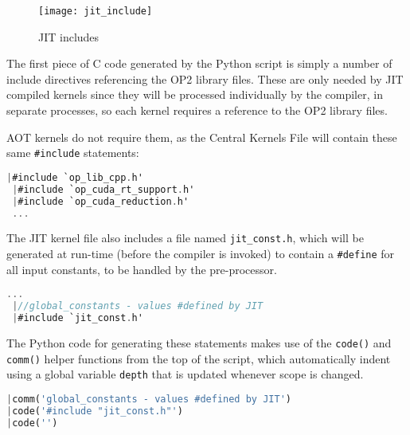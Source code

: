 \clearpage
%
\begin{wrapfigure}[10]{r}{.33\textwidth}
  \centering
  \caption{JIT includes}
  \label{fig:jit_include}
  \texttt{[image: jit\_include]}
\end{wrapfigure}
The first piece of C code generated by the Python script is simply a number of include directives referencing the OP2 library files. These are only needed by JIT compiled kernels since they will be processed individually by the compiler, in separate processes, so each kernel requires a reference to the OP2 library files.
\par
AOT kernels do not require them, as the Central Kernels File will contain these same \verb|#include| statements:
\begin{lstlisting}[backgroundcolor = \color{green!20}, language=C]
 |#include `op_lib_cpp.h'
 |#include `op_cuda_rt_support.h'
 |#include `op_cuda_reduction.h'
 ...
\end{lstlisting}


The JIT kernel file also includes a file named \verb|jit_const.h|, which will be generated at run-time (before the compiler is invoked) to contain a \verb|#define| for all input constants, to be handled by the pre-processor.
\begin{lstlisting}[backgroundcolor = \color{green!20}, language=C]
 ...
 |//global_constants - values #defined by JIT
 |#include `jit_const.h'
\end{lstlisting}

\noindent The Python code for generating these statements makes use of the \verb|code()| and \verb|comm()| helper functions from the top of the script, which automatically indent using a global variable \verb|depth| that is updated whenever scope is changed.

\begin{lstlisting}[backgroundcolor = \color{lightgray!20}, language=Python]
|comm('global_constants - values #defined by JIT')
|code('#include "jit_const.h"')
|code('')
\end{lstlisting}

\clearpage


